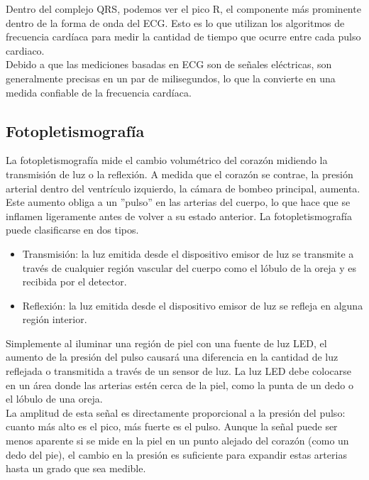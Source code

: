 		Dentro del complejo QRS, podemos ver el pico R, el componente más prominente dentro de la forma de onda del ECG. Esto es lo que utilizan los algoritmos de frecuencia cardíaca para medir la cantidad de tiempo que ocurre entre cada pulso cardiaco. \\
		
		Debido a que las mediciones basadas en ECG son de señales eléctricas, son generalmente precisas en un par de milisegundos, lo que la convierte en una medida confiable de la frecuencia cardíaca. \cite{imotionsECG}
		
		\subsection{Fotopletismografía}
			La fotopletismografía mide el cambio volumétrico del corazón midiendo la transmisión de luz o la reflexión. A medida que el corazón se contrae, la presión arterial dentro del ventrículo izquierdo, la cámara de bombeo principal, aumenta. Este aumento obliga a un ''pulso'' en las arterias del cuerpo, lo que hace que se inflamen ligeramente antes de volver a su estado anterior. La fotopletismografía puede clasificarse en dos tipos. \cite{agarwalHS} \\
			
			\begin{itemize}
				\item Transmisión: la luz emitida desde el dispositivo emisor de luz se transmite a través de cualquier región vascular del cuerpo como el lóbulo de la oreja y es recibida por el detector.
				\item Reflexión: la luz emitida desde el dispositivo emisor de luz se refleja en alguna región interior.
			\end{itemize}
			
			Simplemente al iluminar una región de piel con una fuente de luz LED, el aumento de la presión del pulso causará una diferencia en la cantidad de luz reflejada o transmitida a través de un sensor de luz. La luz LED debe colocarse en un área donde las arterias estén cerca de la piel, como la punta de un dedo o el lóbulo de una oreja. \\
			
			La amplitud de esta señal es directamente proporcional a la presión del pulso: cuanto más alto es el pico, más fuerte es el pulso. Aunque la señal puede ser menos aparente si se mide en la piel en un punto alejado del corazón (como un dedo del pie), el cambio en la presión es suficiente para expandir estas arterias hasta un grado que sea medible. \\
			
